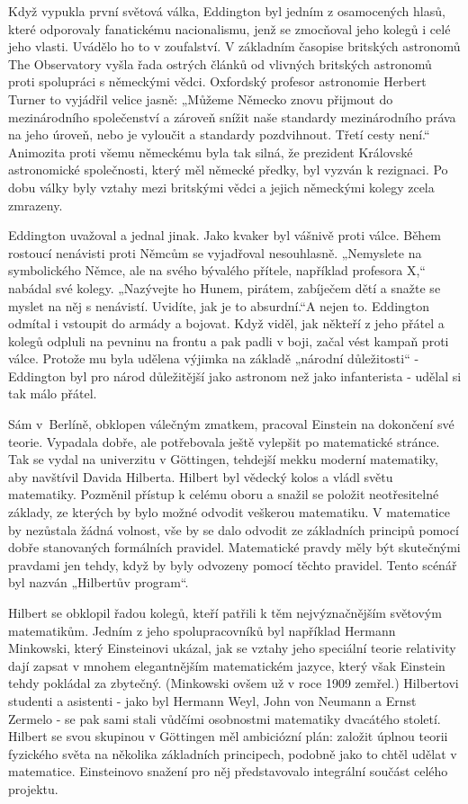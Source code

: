   Když vypukla první světová válka, Eddington byl jedním z osamocených hlasů, které odporovaly
  fanatickému nacionalismu, jenž se zmocňoval jeho kolegů i celé jeho vlasti. Uvádělo ho to v
  zoufalství. V základním časopise britských astronomů The Observatory vyšla řada ostrých článků od
  vlivných britských astronomů proti spolupráci s německými vědci. Oxfordský profesor astronomie
  Herbert Turner to vyjádřil velice jasně: „Můžeme Německo znovu přijmout do mezinárodního
  společenství a zároveň snížit naše standardy mezinárodního práva na jeho úroveň, nebo je vyloučit
  a standardy pozdvihnout. Třetí cesty není.“ Animozita proti všemu německému byla tak silná, že
  prezident Královské astronomické společnosti, který měl německé předky, byl vyzván k rezignaci. Po
  dobu války byly vztahy mezi britskými vědci a jejich německými kolegy zcela zmrazeny. 
  
  Eddington uvažoval a jednal jinak. Jako kvaker byl vášnivě proti válce. Během rostoucí nenávisti
  proti Němcům se vyjadřoval nesouhlasně. „Nemyslete na symbolického Němce, ale na svého bývalého
  přítele, například profesora X,“ nabádal své kolegy. „Nazývejte ho Hunem, pirátem, zabíječem dětí
  a snažte se myslet na něj s nenávistí. Uvidíte, jak je to absurdní.“A nejen to. Eddington odmítal
  i vstoupit do armády a bojovat. Když viděl, jak někteří z jeho přátel a kolegů odpluli na pevninu
  na frontu a pak padli v boji, začal vést kampaň proti válce. Protože mu byla udělena výjimka na
  základě „národní důležitosti“ - Eddington byl pro národ důležitější jako astronom než jako
  infanterista - udělal si tak málo přátel. 
  
  Sám v Berlíně, obklopen válečným zmatkem, pracoval Einstein na dokončení své teorie. Vypadala
  dobře, ale potřebovala ještě vylepšit po matematické stránce. Tak se vydal na univerzitu v
  Göttingen, tehdejší mekku moderní matematiky, aby navštívil Davida Hilberta. Hilbert byl vědecký
  kolos a vládl světu matematiky. Pozměnil přístup k celému oboru a snažil se položit neotřesitelné
  základy, ze kterých by bylo možné odvodit veškerou matematiku. V matematice by nezůstala žádná
  volnost, vše by se dalo odvodit ze základních principů pomocí dobře stanovaných formálních
  pravidel. Matematické pravdy měly být skutečnými pravdami jen tehdy, když by byly odvozeny pomocí
  těchto pravidel. Tento scénář byl nazván „Hilbertův program“. 
  
  Hilbert se obklopil řadou kolegů, kteří patřili k těm nejvýznačnějším světovým matematikům. Jedním
  z jeho spolupracovníků byl například Hermann Minkowski, který Einsteinovi ukázal, jak se vztahy
  jeho speciální teorie relativity dají zapsat v mnohem elegantnějším matematickém jazyce, který
  však Einstein tehdy pokládal za zbytečný. (Minkowski ovšem už v roce 1909 zemřel.) Hilbertovi
  studenti a asistenti - jako byl Hermann Weyl, John von Neumann a Ernst Zermelo - se pak sami stali
  vůdčími osobnostmi matematiky dvacátého století. Hilbert se svou skupinou v Göttingen měl
  ambiciózní plán: založit úplnou teorii fyzického světa na několika základních principech, podobně
  jako to chtěl udělat v matematice. Einsteinovo snažení pro něj představovalo integrální součást
  celého projektu. 
  
